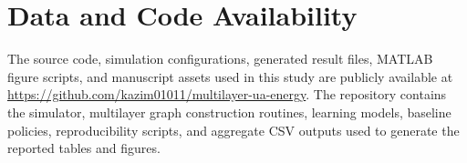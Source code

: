 \documentclass[journal]{IEEEtran}
\begin{document}
\section*{Data and Code Availability}
The source code, simulation configurations, generated result files, MATLAB
figure scripts, and manuscript assets used in this study are publicly available
at \url{https://github.com/kazim01011/multilayer-ua-energy}. The repository
contains the simulator, multilayer graph construction routines, learning
models, baseline policies, reproducibility scripts, and aggregate CSV outputs
used to generate the reported tables and figures.



\end{document}
